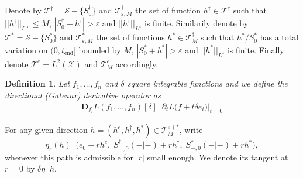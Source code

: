 \documentclass{article}
\newtheorem{definition}{Definition}
\DeclareMathOperator*{\eqdef }{\,\stackrel{\text{def}}{=}\,}
\newcommand{\tend}{t_{\mathrm{end}}}
\begin{document}
\medskip

Denote by $\mathscr{T}^\dagger = \mathscr{S} - \{ S_0^\dagger \}$ and $\mathscr{T}_{\varepsilon,M}^\dagger$ the set of function $h^\dagger \in \mathscr{T}^\dagger$ such that $||h^\dagger||_{L^\infty} \leq M$, $|S_0^\dagger + h^\dagger| > \varepsilon$ and $||h^\dagger||_{L^4}$ is finite. 
Similarily denote by $\mathscr{T}^* = \mathscr{S} - \{ S_{0}^\ast \}$ and $\mathscr{T}_{\varepsilon,M}^\ast$ the set of functions $h^* \in \mathscr{T}_M^\dagger$ such that $h^*/S^\ast_{0}$ has a total variation on $(0, \tend]$ bounded by $M$, $|S_0^\ast + h^\ast| > \varepsilon$ and $||h^*||_{L^4}$ is finite. 
Finally denote $\mathscr{T}^e = L^2(\mathcal{X})$ and $\mathscr{T}^e_M$ accordingly.


\begin{definition}
Let $f_1,\ldots,f_n$ and $\delta$ square integrable functions and we define the directional (Gateaux) derivative operator as
\begin{align*}
\mathbf{D}_{f_i} L(f_1,\ldots,f_n) [\delta] \eqdef \partial_t L \Big( f + t \delta e_i \Big) \Big \vert_{t = 0}
\end{align*}
\end{definition}

For any given direction $h=(h^e,h^\dagger,h^*) \in \mathscr{T}_M^{e \dagger *}$, write
\[
  \eta_r(h) \eqdef \bigl(e_0 + rh^e,\; S^\dagger_{-,0}(-|-)+rh^\dagger,\; S^*_{-,0}(-|-)+rh^*\bigr),
\]
whenever this path is admissible for $|r|$ small enough. We denote its tangent at $r=0$ by $\delta\eta \eqdef h$.
\end{document}
